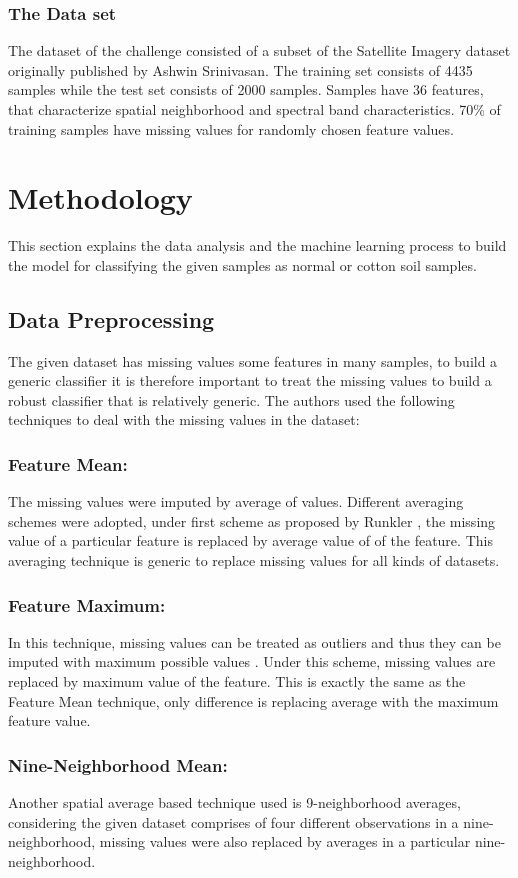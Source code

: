\documentclass{llncs}
\begin{document}
\subsubsection{The Data set}
The dataset of the challenge consisted of a subset of the Satellite Imagery dataset originally published by Ashwin Srinivasan. The training set consists of 4435 samples while the test set consists of 2000 samples. Samples have 36 features, that characterize spatial neighborhood and spectral band characteristics. 70\% of training samples have missing values for randomly chosen feature values.

\section{Methodology}
This section explains the data analysis and the machine learning process to build the model for classifying the given samples as normal  or cotton soil samples. 
\subsection{Data Preprocessing}
The  given dataset has missing values some features in many samples, to build a generic classifier it is therefore important to treat the missing values to build a robust classifier that is relatively generic. The authors used the following techniques to deal with the missing values in the dataset:
%
\subsubsection{Feature Mean:}
%
The missing values were imputed by average of values. Different averaging schemes were adopted, under first scheme as proposed by Runkler \cite{runkler}, the missing value of a particular feature is replaced by average value of of the feature. This averaging technique is generic to replace missing values for all kinds of datasets.
%
\subsubsection{Feature Maximum:}
%
In this technique, missing values can be treated as outliers and thus they can be imputed with maximum possible values \cite{runkler}. Under this scheme, missing values are replaced by maximum value of the feature. This is exactly the same as the Feature Mean technique, only difference is replacing average with the maximum feature value.
%
\subsubsection{Nine-Neighborhood Mean:}
%
Another spatial average based technique used is 9-neighborhood averages, considering the given dataset comprises of four different observations in a nine-neighborhood, missing values were also replaced by averages in a particular nine-neighborhood. 
%
\end{document}
